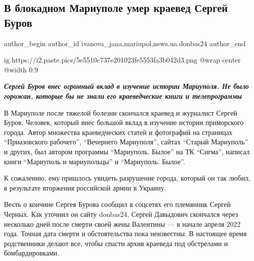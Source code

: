  
 
 
 
 
 
\subsection{В блокадном Мариуполе умер краевед Сергей Буров}
\label{sec:21_04_2022.stz.news.ua.donbas24.1.v_blokadnom_mariupole_umer_sergej_burov}
 
\ifcmt
 author_begin
   author_id ivanova_jana.mariupol,news.ua.donbas24
 author_end
\fi

\ifcmt
  ig https://i2.paste.pics/5e5510c737e201023fe5553fa3b042d3.png
  @wrap center
  @width 0.9
\fi

\begin{center}
  \em\color{blue}\bfseries\Large
Сергей Буров внес огромный вклад в изучение истории Мариуполя. Не было
горожан, которые бы не знали его краеведческие книги и телепрограммы 
\end{center}

В Мариуполе после тяжелой болезни скончался краевед и журналист Сергей Буров.
Человек, который внес большой вклад в изучение истории приморского города.
Автор множества краеведческих статей и фотографий на страницах \enquote{Приазовского
рабочего}, \enquote{Вечернего Мариуполя}, сайтах \enquote{Старый Мариуполь} и других, был
автором программы \enquote{Мариуполь. Былое} на ТК \enquote{Сигма}, написал книги \enquote{Мариуполь и
мариупольцы} и \enquote{Мариуполь. Былое}.

К сожалению, ему пришлось увидеть разрушение города, который он так любил, в
результате вторжения российской армии в Украину.

Весть о кончине Сергея Бурова сообщил в соцсетях его племянник Сергей Черных.
Как уточнил он сайту donbas24, Сергей Давыдович скончался через несколько дней
после смерти своей жены Валентины — в начале апреля 2022 года. Точная дата
смерти и обстоятельства пока неизвестны. В настоящее время родственники делают
все, чтобы спасти архив краеведа под обстрелами и бомбардировками.



